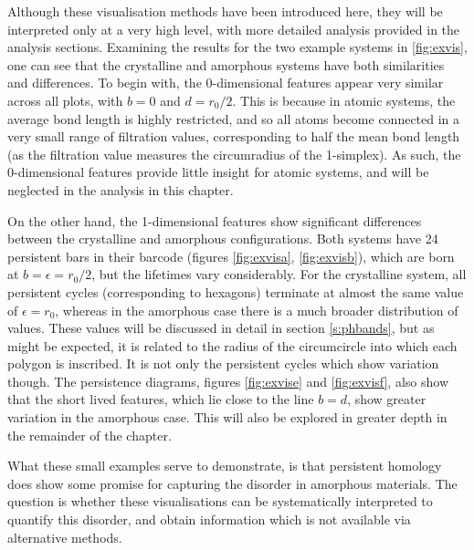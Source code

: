 Although these visualisation methods have been introduced here, they will be interpreted only at a very high level, with more detailed analysis provided in the analysis sections.
Examining the results for the two example systems in \ref{fig:exvis}, one can see that the crystalline and amorphous systems have both similarities and differences.
To begin with, the 0\--dimensional features appear very similar across all plots, with $b=0$ and $d=r_0/2$.
This is because in atomic systems, the average bond length is highly restricted, and so all atoms become connected in a very small range of filtration values, corresponding to half the mean bond length (as the filtration value measures the circumradius of the 1\--simplex).
As such, the $0$\--dimensional features provide little insight for atomic systems, and will be neglected in the analysis in this chapter.

On the other hand, the 1\--dimensional features show significant differences between the crystalline and amorphous configurations.
Both systems have 24 persistent bars in their barcode (figures \ref{fig:exvisa}, \ref{fig:exvisb}), which are born at $b=\epsilon=r_0/2$, but the lifetimes vary considerably. 
For the crystalline system, all persistent cycles (corresponding to hexagons) terminate at almost the same value of $\epsilon=r_0$, whereas in the amorphous case there is a much broader distribution of values.
These values will be discussed in detail in section \ref{s:phbands}, but as might be expected, it is related to the radius of the circumcircle into which each polygon is inscribed. 
It is not only the persistent cycles which show variation though.
The persistence diagrams, figures \ref{fig:exvise} and \ref{fig:exvisf}, also show that the short lived features, which lie close to the line $b=d$, show greater variation in the amorphous case.
This will also be explored in greater depth in the remainder of the chapter.

What these small examples serve to demonstrate, is that persistent homology does show some promise for capturing the disorder in amorphous materials.
The question is whether these visualisations can be systematically interpreted to quantify this disorder, and obtain information which is not available via alternative methods.


